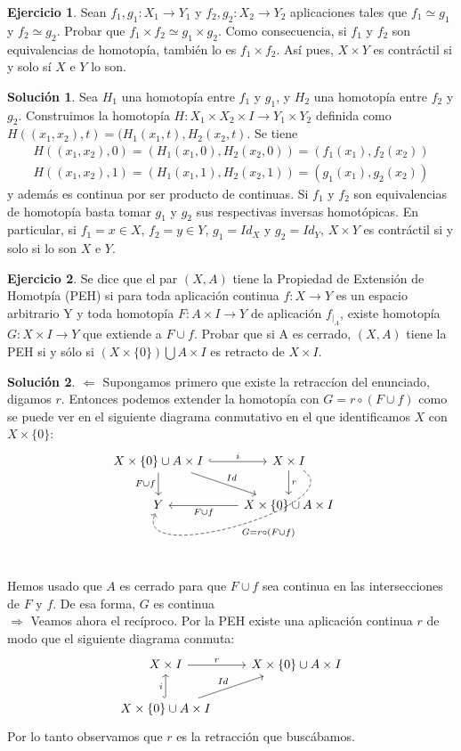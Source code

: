 \documentclass{article}
\theoremstyle{plain}
\theoremstyle{definition}
\newtheorem{exercise}{Ejercicio}
\newtheorem*{sol*}{Solución}
\begin{document}
\newpage
\begin{exercise}
Sean $f_1,g_1:X_1\to Y_1$ y $f_2,g_2:X_2\to Y_2$ aplicaciones tales que $f_1\simeq g_1$ y $f_2\simeq g_2$. Probar que $f_1\times f_2\simeq g_1\times g_2$. Como consecuencia, si $f_1$ y $f_2$ son equivalencias de homotopía, también lo es $f_1\times f_2$. Así pues, $X\times Y$ es contráctil si y solo sí $X$ e $Y$ lo son.
\end{exercise}
\begin{sol*}
Sea $H_1$ una homotopía entre $f_1$ y $g_1$, y $H_2$ una homotopía entre $f_2$ y $g_2$. Construimos la homotopía $H:X_1\times X_2\times I\to Y_1\times Y_2$ definida como $H((x_1,x_2),t)=(H_1(x_1,t),H_2(x_2,t)$. Se tiene
\begin{gather*}
H((x_1,x_2),0)=(H_1(x_1,0),H_2(x_2,0))=(f_1(x_1),f_2(x_2))\\
H((x_1,x_2),1)=(H_1(x_1,1),H_2(x_2,1))=(g_1(x_1),g_2(x_2))
\end{gather*}
y además es continua por ser producto de continuas. Si $f_1$ y $f_2$ son equivalencias de homotopía basta tomar $g_1$ y $g_2$ sus respectivas inversas homotópicas. En particular, si $f_1=x\in X$, $f_2=y\in Y$, $g_1=Id_X$ y $g_2=Id_Y$, $X\times Y$ es contráctil si y solo si lo son $X$ e $Y$. 
\end{sol*}
\newpage
\begin{exercise}
Se dice que el par $(X,A)$ tiene la Propiedad de Extensión de Homotpía (PEH) si para toda aplicación continua $f:X\to Y$ es un espacio arbitrario Y y toda homotopía $F:A\times I \to Y$ de aplicación $f_{|_A}$, existe homotopía $G:X\times I \to Y$ que extiende a $F\cup f$. Probar que si A es cerrado, $(X,A)$ tiene la PEH si y sólo si $(X\times\{ 0\})\bigcup A\times I$ es retracto de $X\times I$.
\end{exercise}
\begin{sol*}
$\boxed{\Leftarrow}$ Supongamos primero que existe la retraccíon del enunciado, digamos $r$. Entonces podemos extender la homotopía con $G=r\circ(F\cup f)$ como se puede ver en el siguiente diagrama conmutativo en el que identificamos $X$ con $X\times\{0\}$:
\[
\begin{tikzcd}
X\times\{0\}\cup A\times I \arrow[hookrightarrow]{r}{i}\arrow[d,"F\cup f"']\arrow[dr,"Id"]& X\times I\arrow[d, "r"]\arrow[dl,"G=r\circ(F\cup f)", bend left=130,dashed]\\
Y & X\times\{0\}\cup A\times I\arrow[l,"F\cup f"]
\end{tikzcd}
\]
Hemos usado que $A$ es cerrado para que $F\cup f$ sea continua en las intersecciones de $F$ y $f$. De esa forma, $G$ es continua\\
$\boxed{\Rightarrow}$ Veamos ahora el recíproco.  Por la PEH existe una aplicación continua $r$ de modo que el siguiente diagrama conmuta:
\[
\begin{tikzcd}
X\times I \arrow[r,"r"]& X\times\{0\}\cup A\times I\\
X\times\{0\}\cup A\times I\arrow[hookrightarrow]{u}{i}\arrow[ur,"Id"]
\end{tikzcd}
\]
Por lo tanto observamos que $r$ es la retracción que buscábamos.
\end{sol*}
\end{document}
